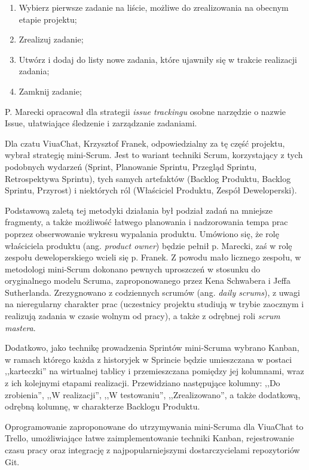 \documentclass[11pt,oneside,a4paper,titlepage,onecolumn]{article}
\begin{document}
\begin{enumerate}
	\item Wybierz pierwsze zadanie na liście, możliwe do zrealizowania na obecnym etapie projektu;
	\item Zrealizuj zadanie;
	\item Utwórz i dodaj do listy nowe zadania, które ujawniły się w trakcie realizacji zadania;
	\item Zamknij zadanie;
\end{enumerate}

P. Marecki opracował dla strategii \textit{issue trackingu} osobne narzędzie o nazwie Issue, ułatwiające
śledzenie i zarządzanie zadaniami.

Dla czatu ViuaChat, Krzysztof Franek, odpowiedzialny za tę część projektu, wybrał strategię mini-Scrum. Jest to
wariant techniki Scrum, korzystający z tych podobnych wydarzeń (Sprint, Planowanie Sprintu, Przegląd Sprintu, 
Retrospektywa Sprintu), tych samych artefaktów (Backlog Produktu, Backlog Sprintu, Przyrost) i niektórych ról 
(Właściciel Produktu, Zespół Deweloperski). 

Podstawową zaletą tej metodyki działania był podział zadań na mniejsze fragmenty, a także możliwość łatwego 
planowania i nadzorowania tempa prac poprzez obserwowanie wykresu wypalania produktu. Umówiono się, że rolę 
właściciela produktu (ang. \textit{product owner}) będzie pełnił p. Marecki, zaś w rolę zespołu deweloperskiego 
wcieli się p. Franek. Z powodu mało licznego zespołu, w metodologi mini-Scrum dokonano pewnych uproszczeń w 
stosunku do oryginalnego modelu Scruma, zaproponowanego przez Kena Schwabera i Jeffa Sutherlanda. Zrezygnowano 
z codziennych scrumów (ang. \textit{daily scrums}), z uwagi na nieregularny charakter prac (uczestnicy projektu
studiują w trybie zaocznym i realizują zadania w czasie wolnym od pracy), a także z odrębnej roli \textit{scrum 
mastera}.

Dodatkowo, jako technikę prowadzenia Sprintów mini-Scruma wybrano Kanban, w ramach którego każda z historyjek 
w Sprincie będzie
umieszczana w postaci ,,karteczki'' na wirtualnej tablicy i przemieszczana pomiędzy jej kolumnami, wraz z
ich kolejnymi etapami realizacji. Przewidziano następujące kolumny: ,,Do zrobienia'', ,,W realizacji'', ,,W 
testowaniu'', ,,Zrealizowano'', a także dodatkową, odrębną kolumnę, w charakterze Backlogu Produktu.

Oprogramowanie zaproponowane do utrzymywania mini-Scruma dla ViuaChat to Trello, umożliwiające łatwe
zaimplementowanie techniki Kanban, rejestrowanie czasu pracy oraz integrację z najpopularniejszymi
dostarczycielami repozytoriów Git.
\end{document}
